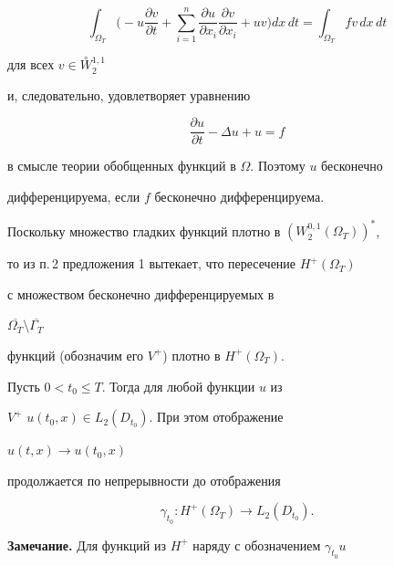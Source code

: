 $$


\int_{\Omega_T}\bigg(-u \frac{\partial v}{\partial t}+


\sum_{i=1}^n \frac{\partial u}{\partial x_i}


\frac{\partial v}{\partial x_i}+uv\bigg)dx\,dt=


\int_{\Omega_T} fv\, dx\,dt


$$


для всех $v\in {\overset{\circ}{W} }{}_2^{1,1}$


и, следовательно, удовлетворяет уравнению


$$


\frac{\partial u}{\partial t} -\Delta u+u=f


$$


в смысле теории обобщенных функций в $\Omega$. Поэтому $u$ бесконечно


дифференцируема, если $f$ бесконечно дифференцируема.





Поскольку множество гладких функций плотно в $(W_2^{0,1}(\Omega_T))^{*}$,


то из п.\,2 предложения 1 вытекает, что пересечение $H^{+}(\Omega_T)$


с множеством бесконечно дифференцируемых в 


$\overline{\Omega_T}\setminus\overline{\Gamma_T}$ 


функций (обозначим его $V^{+}$) плотно в $H^+(\Omega_T)$.\\





\begin{lem}


Пусть $0<t_0\leq T$. Тогда для любой функции $u$ из


$V^+$\; $u(t_0,x)\in L_2(D_{t_0})$. При этом отображение


$u(t,x)\to u(t_0,x)$


продолжается по непрерывности до отображения


$$


\gamma_{t_0}: H^+(\Omega_T)\to L_2(D_{t_0}).


$$


\end{lem}





{\bf Замечание.} Для функций из $H^+$ наряду с обозначением $\gamma_{t_0} u$


